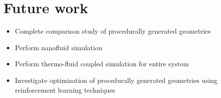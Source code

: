 \documentclass[../main.tex]{subfiles}
\begin{document}
\section{Future work}

\begin{itemize}
    \item Complete comparison study of procedurally generated geometries
    \item Perform nanofluid simulation
    \item Perform thermo-fluid coupled simulation for entire system
    \item Investigate optimization of procedurally generated geometries using reinforcement learning techniques
\end{itemize}
\end{document}

